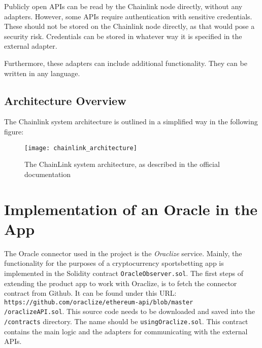 Publicly open APIs can be read by the Chainlink node directly, without any adapters. However, some APIs require authentication with sensitive credentials. These should not be stored on the Chainlink node directly, as that would pose a security risk. Credentials can be stored in whatever way it is specified in the external adapter.

Furthermore, these adapters can include additional functionality. They can be written in any language\cite{chainlinkdoc}.
\subsection*{Architecture Overview}
The Chainlink system architecture is outlined in a simplified way in the following figure:
\begin{figure}[H]
\texttt{[image: chainlink\_architecture]}
\caption{The ChainLink system architecture, as described in the official documentation\cite{chainlinkdoc}}
\end{figure}

\section{Implementation of an Oracle in the App}
The Oracle connector used in the project is the \emph{Oraclize} service. Mainly, the functionality for the purposes of a cryptocurrency sportsbetting app is implemented in the Solidity contract \texttt{OracleObserver.sol}.
The first steps of extending the product app to work with Oraclize, is to fetch the connector contract from Github. It can be found under this URL: \texttt{https://github.com/oraclize/ethereum-api/blob/master
\\
/oraclizeAPI.sol}. This source code needs to be downloaded and saved into the \texttt{/contracts} directory. The name should be \texttt{usingOraclize.sol}. This contract contains the main logic and the adapters for communicating with the external APIs.

